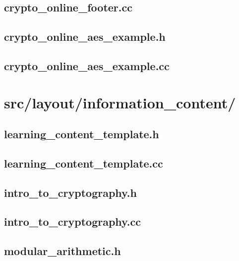 \subsection{crypto\_online\_footer.cc}

\newpage

\subsection{crypto\_online\_aes\_example.h}

\newpage

\subsection{crypto\_online\_aes\_example.cc}

\newpage 

\section{src/layout/information\_content/}

\subsection{learning\_content\_template.h}

\newpage

\subsection{learning\_content\_template.cc}

\newpage

\subsection{intro\_to\_cryptography.h}

\newpage

\subsection{intro\_to\_cryptography.cc}

\newpage

\subsection{modular\_arithmetic.h}

\newpage

